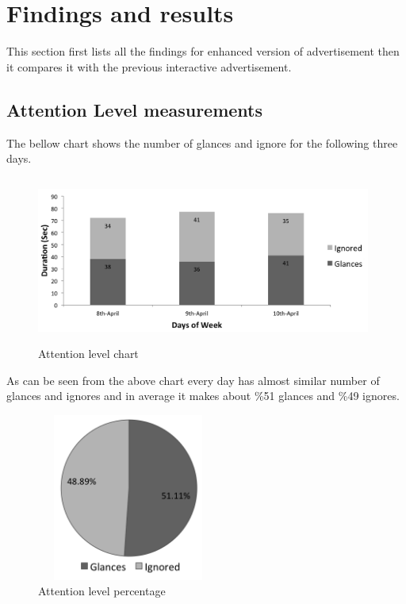 \section{Findings and results}
This section first lists all the findings for enhanced version of advertisement then it compares it with the previous interactive advertisement.


\subsection{Attention Level measurements}
The bellow chart shows the number of glances and ignore for the following three days.

\begin{figure}[H]
    \centering
    \includegraphics[width=110mm,height=55mm]{Figures/9/newbody_Inter_chart}%
    \caption{Attention level chart}%
    \label{fig:newbodyattentionlevelchart}%
\end{figure}


As can be seen from the above chart every day has almost similar number of glances and ignores and in average it makes about \%51 glances and \%49 ignores.


\begin{figure}[H]
    \centering
    \includegraphics[width=60mm,height=55mm]{Figures/9/newbody_inter_percentage}
    \caption{Attention level percentage}%
    \label{fig:Nonattentionlevelpercentage}%
\end{figure}



